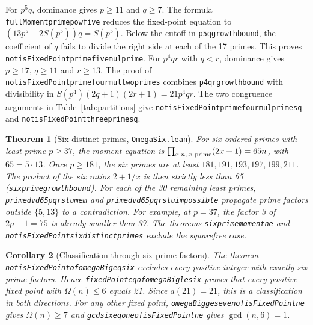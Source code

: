 \documentclass[11pt,reqno]{amsart}
\theoremstyle{plain}
\newtheorem{theorem}{Theorem}[section]
\newtheorem{corollary}[theorem]{Corollary}
\theoremstyle{definition}
\theoremstyle{remark}
\newcommand{\leanid}[1]{\texttt{\upshape\def\_{\char95\relax}#1}}
\begin{document}
For $p^5q$, dominance gives $p\ge11$ and $q\ge7$. The formula \leanid{fullMoment\_\allowbreak prime\_\allowbreak pow\_\allowbreak five} reduces the fixed-point equation to $(13p^5-2S(p^5))q=S(p^5)$. Below the cutoff in \leanid{p5q\_\allowbreak growth\_\allowbreak bound}, the coefficient of $q$ fails to divide the right side at each of the 17 primes. This proves \leanid{not\_\allowbreak isFixedPoint\_\allowbreak prime\_\allowbreak five\_\allowbreak mul\_\allowbreak prime}. For $p^4qr$ with $q<r$, dominance gives $p\ge17$, $q\ge11$ and $r\ge13$. The proof of \leanid{not\_\allowbreak isFixedPoint\_\allowbreak prime\_\allowbreak four\_\allowbreak mul\_\allowbreak two\_\allowbreak primes} combines \leanid{p4qr\_\allowbreak growth\_\allowbreak bound} with divisibility in $S(p^4)(2q+1)(2r+1)=21p^4qr$. The two congruence arguments in Table~\ref{tab:partitions} give \leanid{not\_\allowbreak isFixedPoint\_\allowbreak prime\_\allowbreak four\_\allowbreak mul\_\allowbreak prime\_\allowbreak sq} and \leanid{not\_\allowbreak isFixedPoint\_\allowbreak three\_\allowbreak prime\_\allowbreak sq}.

\begin{theorem}[Six distinct primes, \leanid{OmegaSix.lean}]
For six ordered primes with least prime $p\ge37$, the moment equation is $\prod_{x\mid n,\,x\ {\rm prime}}(2x+1)=65n$, with $65=5\cdot13$. Once $p\ge181$, the six primes are at least $181,191,193,197,199,211$. The product of the six ratios $2+1/x$ is then strictly less than 65 (\leanid{six\_\allowbreak prime\_\allowbreak growth\_\allowbreak bound}). For each of the 30 remaining least primes, \leanid{prime\_\allowbreak dvd\_\allowbreak 65pqrstu\_\allowbreak mem} and \leanid{prime\_\allowbreak dvd\_\allowbreak 65pqrstu\_\allowbreak impossible} propagate prime factors outside $\{5,13\}$ to a contradiction. For example, at $p=37$, the factor 3 of $2p+1=75$ is already smaller than 37. The theorems \leanid{six\_\allowbreak prime\_\allowbreak moment\_\allowbreak ne} and \leanid{not\_\allowbreak isFixedPoint\_\allowbreak six\_\allowbreak distinct\_\allowbreak primes} exclude the squarefree case.
\end{theorem}

\begin{corollary}[Classification through six prime factors]
The theorem \leanid{not\_\allowbreak isFixedPoint\_\allowbreak of\_\allowbreak omegaBig\_\allowbreak eq\_\allowbreak six} excludes every positive integer with exactly six prime factors. Hence \leanid{fixedPoint\_\allowbreak eq\_\_\allowbreak of\_\allowbreak omegaBig\_\allowbreak le\_\allowbreak six} proves that every positive fixed point with $\Omega(n)\le6$ equals 21. Since $a(21)=21$, this is a classification in both directions. For any other fixed point, \leanid{omegaBig\_\allowbreak ge\_\allowbreak seven\_\allowbreak of\_\allowbreak isFixedPoint\_\allowbreak ne\_} gives $\Omega(n)\ge7$ and \leanid{gcd\_\allowbreak six\_\allowbreak eq\_\allowbreak one\_\allowbreak of\_\allowbreak isFixedPoint\_\allowbreak ne\_\allowbreak 21} gives $\gcd(n,6)=1$.
\end{corollary}
\end{document}
